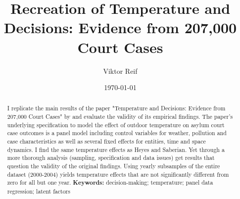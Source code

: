 \documentclass[11pt]{article}
\title{Recreation of Temperature and Decisions: Evidence from 207,000
	Court Cases}
\author{Viktor Reif}
\date{\today}
\begin{document}
	\maketitle
	
	
	\begin{abstract}
		\singlespacing
		\noindent 
		I replicate the main results of the paper "Temperature and Decisions: Evidence from 207,000 Court Cases" by \cite{Heyes.2019} and evaluate the validity of its empirical findings. The paper's underlying specification to model the effect of outdoor temperature on asylum court case outcomes is a panel model including control variables for weather, pollution and case characteristics as well as several fixed effects for entities, time and space dynamics. I find the same temperature effects as Heyes and Saberian. Yet through a more thorough analysis (sampling, specification and data issues) get results that question the validity of the original findings. Using yearly subsamples of the entire dataset (2000-2004) yields temperature effects that are not significantly different from zero for all but one year.
		\newline \noindent \textbf{Keywords:} decision-making; temperature; panel data regression; latent factors
	\end{abstract} \newpage

	
	
\end{document}
